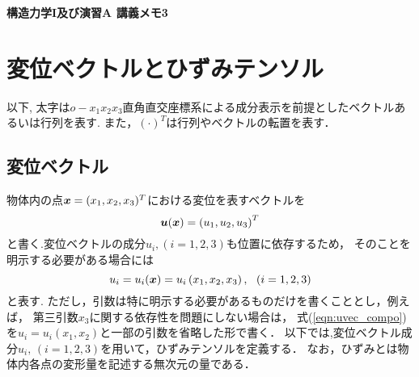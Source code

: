 \documentclass[10pt,a4j]{jarticle}
\newlength{\minitwocolumn}
\begin{document}
\newcommand{\fat}[1]{\mbox{\boldmath $#1$}}
\newcommand{\D}{\partial}
\newcommand{\w}{\omega}
\newcommand{\ga}{\alpha}
\newcommand{\gb}{\beta}
\newcommand{\gx}{\xi}
\newcommand{\gz}{\zeta}
\newcommand{\vhat}[1]{\hat{\fat{#1}}}
\newcommand{\spc}{\vspace{0.7\baselineskip}}
\newcommand{\halfspc}{\vspace{0.3\baselineskip}}

\newcommand{\twofig}[2]
 {
   \begin{figure}
     \begin{minipage}[t]{\minitwocolumn}
         \begin{center}   #1
         \end{center}
     \end{minipage}
         \hspace{\columnsep}
     \begin{minipage}[t]{\minitwocolumn}
         \begin{center} #2
         \end{center}
     \end{minipage}
   \end{figure}
 }
\begin{center}
	{\Large \bf 構造力学I及び演習A 講義メモ3} \\
\end{center}
\section{変位ベクトルとひずみテンソル}
以下, 太字は$o-x_1x_2x_3$直角直交座標系による成分表示を前提としたベクトルあるいは行列を表す.
また，$(\cdot)^T$は行列やベクトルの転置を表す．
\subsection{変位ベクトル}
物体内の点$\fat{x}=(x_1,x_2,x_3)^T$における変位を表すベクトルを
\begin{equation}
	\fat{u}(\fat{x})=\left( u_1, u_2, u_3 \right)^T
	\label{eqn:uvec}
\end{equation}
と書く.変位ベクトルの成分$u_i,(i=1,2,3)$も位置に依存するため，
そのことを明示する必要がある場合には
\begin{equation}
	u_i=u_i(\fat{x})=u_i\left(x_1, x_2, x_3\right), \ \ (i=1,2,3)
	\label{eqn:uvec_compo}
\end{equation}
と表す.
ただし，引数は特に明示する必要があるものだけを書くこととし，例えば，
第三引数$x_3$に関する依存性を問題にしない場合は，
式(\ref{eqn:uvec_compo})を$u_i=u_i(x_1,x_2)$と一部の引数を省略した形で書く．
以下では,変位ベクトル成分$u_i,\,(i=1,2,3)$を用いて，ひずみテンソルを定義する．
なお，ひずみとは物体内各点の変形量を記述する無次元の量である．
%
\end{document}
